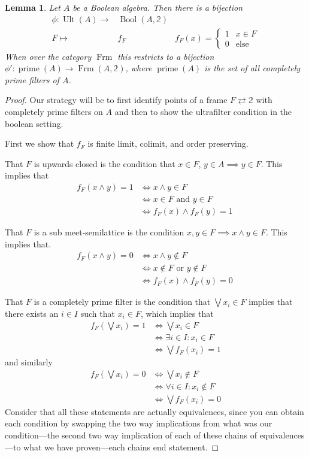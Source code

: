 \documentclass[12pt,a4paper]{article}
\newtheorem{lemma}{Lemma}[section] %
\DeclareMathOperator{\Frm}{Frm}
\DeclareMathOperator{\Bool}{Bool}
\DeclareMathOperator{\Ult}{Ult}
\DeclareMathOperator{\prim}{prime}
\begin{document}
\begin{lemma}
	Let $A$ be a Boolean algebra. Then there is a bijection \begin{align*}
  	\phi: \Ult(A) \to& \Bool(A, \mathbb{2})\\
  	F \mapsto& f_F &f_F(x) = \begin{cases}
   1 & x \in F \\
    0 & \text{else}
  \end{cases}
  \end{align*}
  When over the category $\Frm$ this restricts to  a bijection $\phi': \prim(A) \to \Frm(A, \mathbb{2})$, where $\prim(A)$ is the set of all completely prime filters of $A$.
\end{lemma}


 
\begin{proof}
 	Our strategy will be to first identify  points of a frame $F \rightleftarrows \mathbb{2}$  with  completely prime filters on $A$ and then to show the ultrafilter condition in the boolean setting. 
 	
 	First we show that $f_F$ is finite limit, colimit, and order preserving. 
  
 That $F$ is upwards closed is the condition that $x \in F$, $y \in A \implies y \in F$. This implies that
  \begin{align*}
 	f_F(x \wedge y) = 1 &\iff x \wedge y \in F\\ &\iff x \in F\text{ and } y \in F\\ &\iff f_F(x) \wedge f_F(y) =1 \
 \end{align*}
 
 
  That $F$ is a sub meet-semilattice is the condition $x, y \in F \implies x \land y \in F$. This implies that. \begin{align*}
 	f_F(x \wedge y) = 0 &\iff x \wedge y \notin F\\ &\iff x \notin F\text{ or } y \notin F\\ &\iff f_F(x)  \wedge f_F(y) =0 \
 \end{align*}


That $F$ is a completely prime filter is the condition that $\bigvee x_i \in F$ implies that there exists an $i \in I$ such that $x_i \in F$, which implies that \begin{align*}
	f_F( \bigvee x_i) = 1 &\iff \bigvee x_i \in F\\ &\iff \exists i \in I : x_i \in F\\
	&\iff \bigvee f_F(x_i) = 1
\end{align*}
and similarly \begin{align*}
	f_F( \bigvee x_i) = 0 &\iff \bigvee x_i \notin F\\ &\iff \forall i \in I:x_i \notin F \\
	&\iff \bigvee f_F(x_i)  = 0
\end{align*}
Consider that all these statements are actually equivalences, since you can obtain each condition by swapping the two way implications from what was our condition---the second two way implication of each of these chains of equivalences---to what we have proven---each chains end statement.


\end{proof}
\end{document}
